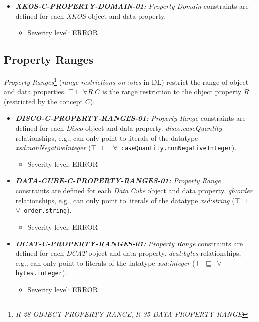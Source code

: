 \documentclass{llncs}
\newcommand{\ms}[1]{\texttt{#1}}
\begin{document}
\begin{itemize}
	\item \textbf{{\em XKOS-C-PROPERTY-DOMAIN-01:}} 
	{\em Property Domain} constraints are defined for each \emph{XKOS} object and data property.
	\begin{itemize}
		\item Severity level: ERROR
	\end{itemize}
\end{itemize}

\subsection{Property Ranges}

{\em Property Ranges}\footnote{{\em R-28-OBJECT-PROPERTY-RANGE}, {\em R-35-DATA-PROPERTY-RANGE}} ({\em range restrictions on roles} in DL) restrict the range of object and data properties.
$\top \sqsubseteq \forall R . C$ is the range restriction to the object property $R$ (restricted by the concept $C$). 

\begin{itemize}
	\item \textbf{{\em DISCO-C-PROPERTY-RANGES-01:}} 
	{\em Property Range} constraints are defined for each \emph{Disco} object and data property.
  {\em disco:caseQuantity} relationships, e.g., can only point to literals of the datatype {\em xsd:nonNegativeInteger} (\ms{$\top$ $\sqsubseteq$ $\forall$ caseQuantity.nonNegativeInteger}).
	\begin{itemize}
		\item Severity level: ERROR
	\end{itemize}
\end{itemize}

\begin{itemize}
	\item \textbf{{\em DATA-CUBE-C-PROPERTY-RANGES-01:}} 
	{\em Property Range} constraints are defined for each \emph{Data Cube} object and data property.
  {\em qb:order} relationships, e.g., can only point to literals of the datatype {\em xsd:string} (\ms{$\top$ $\sqsubseteq$ $\forall$ order.string}).
	\begin{itemize}
		\item Severity level: ERROR
	\end{itemize}
\end{itemize}

\begin{itemize}
	\item \textbf{{\em DCAT-C-PROPERTY-RANGES-01:}} 
	{\em Property Range} constraints are defined for each \emph{DCAT} object and data property.
  {\em dcat:bytes} relationships, e.g., can only point to literals of the datatype {\em xsd:integer} (\ms{$\top$ $\sqsubseteq$ $\forall$ bytes.integer}).
	\begin{itemize}
		\item Severity level: ERROR
	\end{itemize}
\end{itemize}
\end{document}

